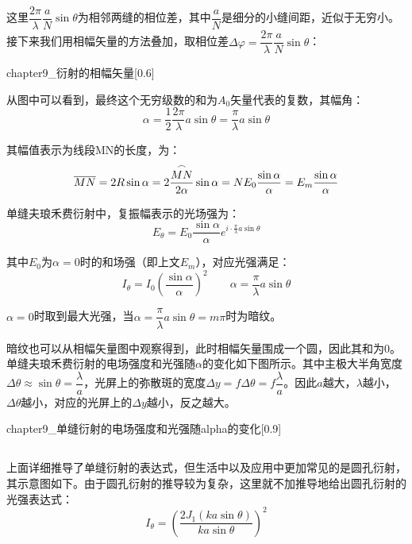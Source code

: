 这里$\dfrac{2\pi}{\lambda}\dfrac{a}{N}\sin \theta$为相邻两缝的相位差，其中$\dfrac{a}{N}$是细分的小缝间距，近似于无穷小。接下来我们用相幅矢量的方法叠加，取相位差$\Delta \varphi = \dfrac{2\pi}{\lambda}\dfrac{a}{N}\sin \theta$：
\begin{singlefigure}[衍射的相幅矢量]{chapter9_衍射的相幅矢量}[0.6]
\end{singlefigure}

从图中可以看到，最终这个无穷级数的和为$A_0$矢量代表的复数，其幅角：
\[\alpha = \dfrac{1}{2}\dfrac{2\pi}{\lambda}a\sin \theta = \dfrac{\pi}{\lambda}a\sin \theta\]

其幅值表示为线段MN的长度，为：
\[\overline{MN} = 2R\sin\alpha = 2\dfrac{\overset{\LARGE{\frown}}{MN}}{2\alpha}\sin \alpha = NE_0\dfrac{\sin\alpha}{\alpha} = E_m\dfrac{\sin\alpha}{\alpha}\]

\begin{law}[单缝夫琅禾费衍射]
    单缝夫琅禾费衍射中，复振幅表示的光场强为：
    \[E_{\theta} = E_0\dfrac{\sin\alpha}{\alpha}e^{i\cdot\frac{\pi}{\lambda}a\sin \theta}\]

    其中$E_0$为$\alpha = 0$时的和场强（即上文$E_m$），对应光强满足：
    \[I_{\theta} = I_0\left(\dfrac{\sin\alpha}{\alpha}\right)^2\qquad \alpha = \dfrac{\pi}{\lambda}a\sin \theta\]

    $\alpha = 0$时取到最大光强，当$\alpha = \dfrac{\pi}{\lambda}a\sin \theta = m\pi$时为暗纹。
\end{law}

暗纹也可以从相幅矢量图中观察得到，此时相幅矢量围成一个圆，因此其和为0。单缝夫琅禾费衍射的电场强度和光强随$\alpha$的变化如下图所示。其中主极大半角宽度$\Delta \theta \approx\sin\theta = \dfrac{\lambda}{a}$，光屏上的弥散斑的宽度$\Delta y = f\Delta \theta=f\dfrac{\lambda}{a}$。因此$a$越大，$\lambda$越小，$\Delta \theta$越小，对应的光屏上的$\Delta y$越小，反之越大。
\begin{singlefigure}{chapter9_单缝衍射的电场强度和光强随alpha的变化}[0.9]
\end{singlefigure}

\subsection[夫琅禾费圆孔衍射]{}
上面详细推导了单缝衍射的表达式，但生活中以及应用中更加常见的是圆孔衍射，其示意图如下。由于圆孔衍射的推导较为复杂，这里就不加推导地给出圆孔衍射的光强表达式：
\[I_{\theta} = \left(\dfrac{2J_1 (k a \sin \theta)}{ka\sin \theta}\right)^2\]

